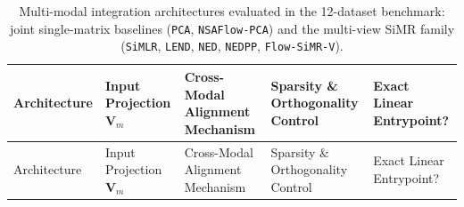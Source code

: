 \documentclass[
  10pt,
  letterpaper,
]{report}
\begin{document}
\begin{longtable}[]{@{}
  >{\raggedright\arraybackslash}p{}
  >{\raggedright\arraybackslash}p{}
  >{\raggedright\arraybackslash}p{}
  >{\raggedright\arraybackslash}p{}
  >{\raggedright\arraybackslash}p{}@{}}
\caption{Multi-modal integration architectures evaluated in the
12-dataset benchmark: joint single-matrix baselines
(\protect\texttt{PCA}, \protect\texttt{NSAFlow-PCA}) and the multi-view
SiMR family (\protect\texttt{SiMLR}, \protect\texttt{LEND},
\protect\texttt{NED}, \protect\texttt{NEDPP},
\protect\texttt{Flow-SiMR-V}).}\label{tbl-benchmark-models}\tabularnewline
\toprule\noalign{}
\begin{minipage}[b]{\linewidth}\raggedright
Architecture
\end{minipage} & \begin{minipage}[b]{\linewidth}\raggedright
Input Projection \(\mathbf{V}_m\)
\end{minipage} & \begin{minipage}[b]{\linewidth}\raggedright
Cross-Modal Alignment Mechanism
\end{minipage} & \begin{minipage}[b]{\linewidth}\raggedright
Sparsity \& Orthogonality Control
\end{minipage} & \begin{minipage}[b]{\linewidth}\raggedright
Exact Linear Entrypoint?
\end{minipage} \\
\midrule\noalign{}
\endfirsthead
\toprule\noalign{}
\begin{minipage}[b]{\linewidth}\raggedright
Architecture
\end{minipage} & \begin{minipage}[b]{\linewidth}\raggedright
Input Projection \(\mathbf{V}_m\)
\end{minipage} & \begin{minipage}[b]{\linewidth}\raggedright
Cross-Modal Alignment Mechanism
\end{minipage} & \begin{minipage}[b]{\linewidth}\raggedright
Sparsity \& Orthogonality Control
\end{minipage} & \begin{minipage}[b]{\linewidth}\raggedright
Exact Linear Entrypoint?
\end{minipage} \\

\end{longtable}
\end{document}
